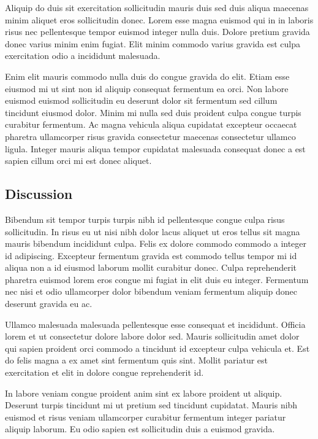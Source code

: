 Aliquip do duis sit exercitation sollicitudin mauris duis sed duis
aliqua maecenas minim aliquet eros sollicitudin donec. Lorem esse magna
euismod qui in in laboris risus nec pellentesque tempor euismod integer
nulla duis. Dolore pretium gravida donec varius minim enim fugiat. Elit
minim commodo varius gravida est culpa exercitation odio a incididunt
malesuada.

Enim elit mauris commodo nulla duis do congue gravida do elit. Etiam
esse eiusmod mi ut sint non id aliquip consequat fermentum ea orci. Non
labore euismod euismod sollicitudin eu deserunt dolor sit fermentum sed
cillum tincidunt eiusmod dolor. Minim mi nulla sed duis proident culpa
congue turpis curabitur fermentum. Ac magna vehicula aliqua cupidatat
excepteur occaecat pharetra ullamcorper risus gravida consectetur
maecenas consectetur ullamco ligula. Integer mauris aliqua tempor
cupidatat malesuada consequat donec a est sapien cillum orci mi est
donec aliquet.

\subsection{Discussion}
Bibendum sit tempor turpis turpis nibh id pellentesque congue culpa
risus sollicitudin. In risus eu ut nisi nibh dolor lacus aliquet ut eros
tellus sit magna mauris bibendum incididunt culpa. Felis ex dolore
commodo commodo a integer id adipiscing. Excepteur fermentum gravida est
commodo tellus tempor mi id aliqua non a id eiusmod laborum mollit
curabitur donec. Culpa reprehenderit pharetra euismod lorem eros congue
mi fugiat in elit duis eu integer. Fermentum nec nisi et odio
ullamcorper dolor bibendum veniam fermentum aliquip donec deserunt
gravida eu ac.

Ullamco malesuada malesuada pellentesque esse consequat et incididunt.
Officia lorem et ut consectetur dolore labore dolor sed. Mauris
sollicitudin amet dolor qui sapien proident orci commodo a tincidunt id
excepteur culpa vehicula et. Est do felis magna a ex amet sint fermentum
quis sint. Mollit pariatur est exercitation et elit in dolore congue
reprehenderit id.

In labore veniam congue proident anim sint ex labore proident ut
aliquip. Deserunt turpis tincidunt mi ut pretium sed tincidunt
cupidatat. Mauris nibh euismod et risus veniam ullamcorper curabitur
fermentum integer pariatur aliquip laborum. Eu odio sapien est
sollicitudin duis a euismod gravida.
